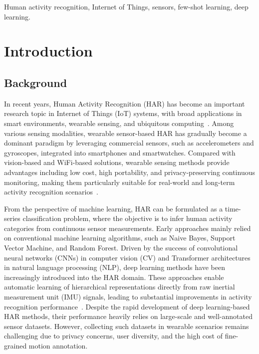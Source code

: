 \documentclass[journal]{IEEEtran}
\begin{document}
\begin{IEEEkeywords}
Human activity recognition, Internet of Things, sensors, few-shot learning, deep learning.
\end{IEEEkeywords}

\section{Introduction}
\label{sec:intro}

\subsection{Background}

In recent years, Human Activity Recognition (HAR) has become an important research topic in Internet of Things (IoT) systems, with broad applications in smart environments, wearable sensing, and ubiquitous computing~\cite{har1,har2}. Among various sensing modalities, wearable sensor-based HAR has gradually become a dominant paradigm by leveraging commercial sensors, such as accelerometers and gyroscopes, integrated into smartphones and smartwatches. Compared with vision-based and WiFi-based solutions, wearable sensing methods provide advantages including low cost, high portability, and privacy-preserving continuous monitoring, making them particularly suitable for real-world and long-term activity recognition scenarios~\cite{har3,har4}.

From the perspective of machine learning, HAR can be formulated as a time-series classification problem, where the objective is to infer human activity categories from continuous sensor measurements. Early approaches mainly relied on conventional machine learning algorithms, such as Naive Bayes, Support Vector Machine, and Random Forest. Driven by the success of convolutional neural networks (CNNs) in computer vision (CV) and Transformer architectures in natural language processing (NLP), deep learning methods have been increasingly introduced into the HAR domain. These approaches enable automatic learning of hierarchical representations directly from raw inertial measurement unit (IMU) signals, leading to substantial improvements in activity recognition performance~\cite{har5,har6}. Despite the rapid development of deep learning-based HAR methods, their performance heavily relies on large-scale and well-annotated sensor datasets. However, collecting such datasets in wearable scenarios remains challenging due to privacy concerns, user diversity, and the high cost of fine-grained motion annotation.
\end{document}
